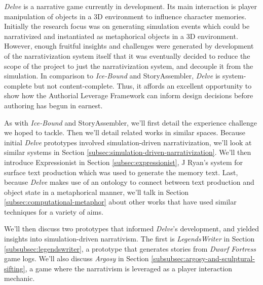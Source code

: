 

\textit{Delve} is a narrative game currently in development. Its main interaction is player manipulation of objects in a 3D environment to influence character memories. Initially the research focus was on generating simulation events which could be narrativized and instantiated as metaphorical objects in a 3D environment. However, enough fruitful insights and challenges were generated by development of the narrativization system itself that it was eventually decided to reduce the scope of the project to just the narrativization system, and decouple it from the simulation. In comparison to \textit{Ice-Bound} and StoryAssembler, \textit{Delve} is system-complete but not content-complete. Thus, it affords an excellent opportunity to show how the Authorial Leverage Framework can inform design decisions before authoring has begun in earnest.

As with \textit{Ice-Bound} and StoryAssembler, we'll first detail the experience challenge we hoped to tackle. Then we'll detail related works in similar spaces. Because initial \textit{Delve} prototypes involved simulation-driven narrativization, we'll look at similar systems in Section \ref{subsec:simulation-driven-narrativization}. We'll then introduce Expressionist in Section \ref{subsec:expressionist}, J Ryan's system for surface text production which was used to generate the memory text. Last, because \textit{Delve} makes use of an ontology to connect between text production and object state in a metaphorical manner, we'll talk in Section \ref{subsec:computational-metaphor} about other works that have used similar techniques for a variety of aims.

We'll then discuss two prototypes that informed \textit{Delve}'s development, and yielded insights into simulation-driven narrativism. The first is \textit{LegendsWriter} in Section \ref{subsubsec:legendswriter}, a prototype that generates stories from \textit{Dwarf Fortress} game logs. We'll also discuss \textit{Argosy} in Section \ref{subsubsec:argosy-and-sculptural-sifting}, a game where the narrativism is leveraged as a player interaction mechanic. 


